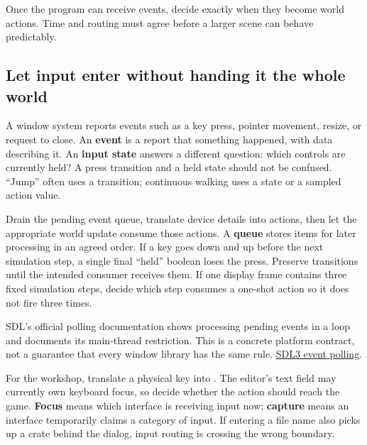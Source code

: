 \hypertarget{05-engine-i-ch013-let-one-input-produce-one-intended-change}{}

Once the program can receive events, decide exactly when they become world actions. Time and routing must agree before a larger scene can behave predictably.

\subsection{Let input enter without handing it the whole world}\label{05-engine-i-ch013-let-input-enter-without-handing-it-the-whole-world}

\hypertarget{05-engine-i-ch013-let-input-enter-without-handing-it-the-whole-world}{}

A window system reports events such as a key press, pointer movement, resize, or request to close. An \textbf{event} is a report that something happened, with data describing it. An \textbf{input state} answers a different question: which controls are currently held? A press transition and a held state should not be confused. ``Jump'' often uses a transition; continuous walking uses a state or a sampled action value.

Drain the pending event queue, translate device details into actions, then let the appropriate world update consume those actions. A \textbf{queue} stores items for later processing in an agreed order. If a key goes down and up before the next simulation step, a single final ``held'' boolean loses the press. Preserve transitions until the intended consumer receives them. If one display frame contains three fixed simulation steps, decide which step consumes a one-shot action so it does not fire three times.

SDL's official polling documentation shows processing pending events in a loop and documents its main-thread restriction. This is a concrete platform contract, not a guarantee that every window library has the same rule. \href{https://wiki.libsdl.org/SDL3/SDL_PollEvent}{SDL3 event polling}.

For the workshop, translate a physical key into . The editor's text field may currently own keyboard focus, so decide whether the action should reach the game. \textbf{Focus} means which interface is receiving input now; \textbf{capture} means an interface temporarily claims a category of input. If entering a file name also picks up a crate behind the dialog, input routing is crossing the wrong boundary.

